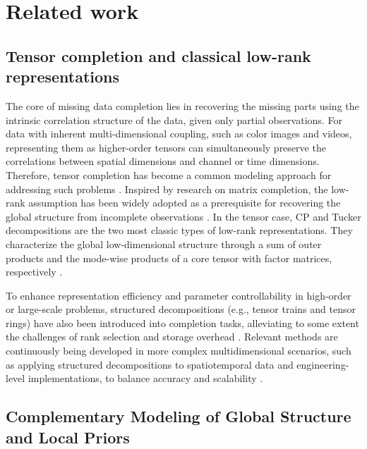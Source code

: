 \documentclass[a4paper,12pt]{article}
\numberwithin{equation}{section}
\numberwithin{algorithm}{section}
\theoremstyle{remark}
\theoremstyle{definition}
\begin{document}
\section{Related work}

\subsection{Tensor completion and classical low-rank representations}
The core of missing data completion lies in recovering the missing parts using the intrinsic correlation structure of the data, given only partial observations. For data with inherent multi-dimensional coupling, such as color images and videos, representing them as higher-order tensors can simultaneously preserve the correlations between spatial dimensions and channel or time dimensions. Therefore, tensor completion has become a common modeling approach for addressing such problems \cite{liu2013tensor, panagakis2021tensorcvdl}. Inspired by research on matrix completion, the low-rank assumption has been widely adopted as a prerequisite for recovering the global structure from incomplete observations \cite{candes2009matrix}. In the tensor case, CP and Tucker decompositions are the two most classic types of low-rank representations. They characterize the global low-dimensional structure through a sum of outer products and the mode-wise products of a core tensor with factor matrices, respectively \cite{kolda2009tensor}.

To enhance representation efficiency and parameter controllability in high-order or large-scale problems, structured decompositions (e.g., tensor trains and tensor rings) have also been introduced into completion tasks, alleviating to some extent the challenges of rank selection and storage overhead \cite{oseledets2011tt,bengua2017tt}. Relevant methods are continuously being developed in more complex multidimensional scenarios, such as applying structured decompositions to spatiotemporal data and engineering-level implementations, to balance accuracy and scalability \cite{yuan2019tensor,chen2025geotensor}.





\subsection{Complementary Modeling of Global Structure and Local Priors}
\end{document}
